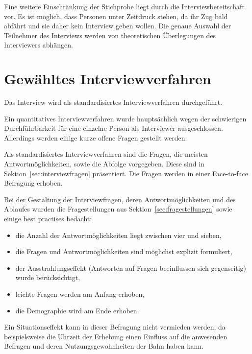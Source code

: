 \documentclass[]{article}
\begin{document}
Eine weitere Einschränkung der Stichprobe liegt durch die Interviewbereitschaft vor. Es ist möglich, dass Personen unter Zeitdruck stehen, da ihr Zug bald abfährt und sie daher kein Interview geben wollen. Die genaue Auswahl der Teilnehmer des Interviews werden von theoretischen Überlegungen des Interviewers abhängen.

\section{Gewähltes Interviewverfahren}
Das Interview wird als standardisiertes Interviewverfahren durchgeführt.

Ein quantitatives Interviewverfahren wurde hauptsächlich wegen der schwierigen Durchführbarkeit für eine einzelne Person als Interviewer ausgeschlossen. Allerdings werden einige kurze offene Fragen gestellt werden.

Als standardisiertes Interviewverfahren sind die Fragen, die meisten Antwortmöglichkeiten, sowie die Abfolge vorgegeben. Diese sind in Sektion~\ref{sec:interviewfragen} präsentiert. Die Fragen werden in einer Face-to-face Befragung erhoben.

Bei der Gestaltung der Interviewfragen, deren Antwortmöglichkeiten und des Ablaufes wurden die Fragestellungen aus Sektion~\ref{sec:fragestellungen} sowie einige best practises bedacht:
\begin{itemize}
	\item die Anzahl der Antwortmöglichkeiten liegt zwischen vier und sieben,
	\item die Fragen und Antwortmöglichkeiten sind möglichst explizit formuliert,
	\item der Ausstrahlungseffekt (Antworten auf Fragen beeinflussen sich gegenseitig) wurde berücksichtigt,
	\item leichte Fragen werden am Anfang erhoben,
	\item die Demographie wird am Ende erhoben.
\end{itemize}

Ein Situationseffekt kann in dieser Befragung nicht vermieden werden, da beispielsweise die Uhrzeit der Erhebung einen Einfluss auf die anwesenden Befragen und deren Nutzungsgewohnheiten der Bahn haben kann.
\end{document}
